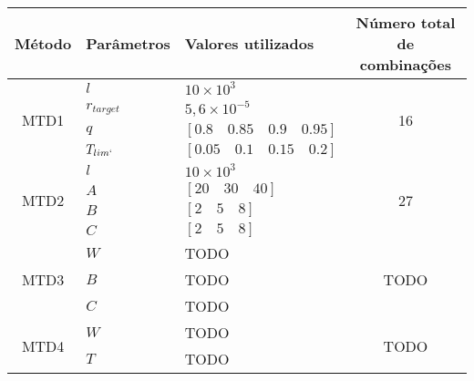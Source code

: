 \begin{table}[htb]
{
	\begin{tabular}{cllc}
		\toprule
		Método 					& Parâmetros	& Valores utilizados						& Número total de combinações \\
		\midrule \midrule					
		\multirow{4}{*}{MTD1}	& $l$			& $10 \times 10^3$							& \multirow{4}{*}{16} \\
								& $r_{target}$	& $5,6 \times 10^{-5}$						& \\
								& $q$			& $[0.8 \quad 0.85 \quad 0.9 \quad 0.95]$	& \\
								& $T_{lim`}$	& $[0.05 \quad 0.1 \quad 0.15 \quad 0.2]$	& \\
		\midrule
		\multirow{4}{*}{MTD2}	& $l$			& $10 \times 10^3$							& \multirow{4}{*}{27} \\
								& $A$			& $[20 \quad 30 \quad 40]$					& \\
								& $B$			& $[2 \quad 5 \quad 8]$						& \\
								& $C$			& $[2 \quad 5 \quad 8]$						& \\
		\midrule					
		\multirow{3}{*}{MTD3}	& $W$			& TODO										& \multirow{3}{*}{TODO} \\
								& $B$			& TODO										& \\
								& $C$			& TODO										& \\
		\midrule					
		\multirow{2}{*}{MTD4}	& $W$			& TODO										& \multirow{2}{*}{TODO} \\
								& $T$			& TODO										& \\
		\bottomrule
	\end{tabular}
}{}
\end{table}
